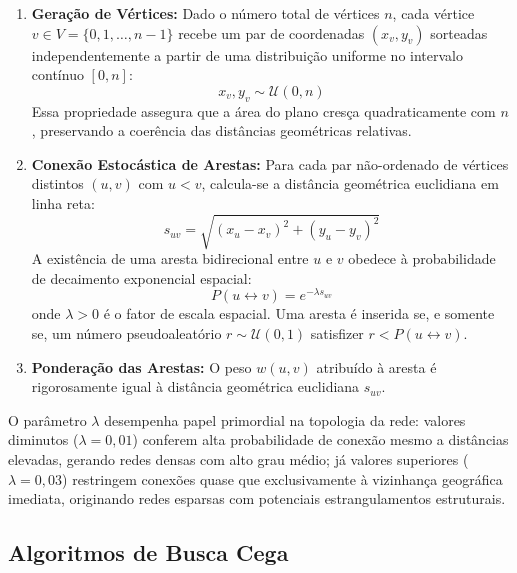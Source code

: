 \documentclass[a4paper,10pt,twocolumn]{article}
\begin{document}
\begin{enumerate}
    \item \textbf{Geração de Vértices:} Dado o número total de vértices $n$, cada vértice $v \in V = \{0, 1, \dots, n-1\}$ recebe um par de coordenadas $(x_v, y_v)$ sorteadas independentemente a partir de uma distribuição uniforme no intervalo contínuo $[0, n]$:
    \begin{equation}
        x_v, y_v \sim \mathcal{U}(0, n)
    \end{equation}
    Essa propriedade assegura que a área do plano cresça quadraticamente com $n$, preservando a coerência das distâncias geométricas relativas.
    
    \item \textbf{Conexão Estocástica de Arestas:} Para cada par não-ordenado de vértices distintos $(u, v)$ com $u < v$, calcula-se a distância geométrica euclidiana em linha reta:
    \begin{equation}
        s_{uv} = \sqrt{(x_u - x_v)^2 + (y_u - y_v)^2}
    \end{equation}
    A existência de uma aresta bidirecional entre $u$ e $v$ obedece à probabilidade de decaimento exponencial espacial:
    \begin{equation}
        P(u \leftrightarrow v) = e^{-\lambda s_{uv}}
    \end{equation}
    onde $\lambda > 0$ é o fator de escala espacial. Uma aresta é inserida se, e somente se, um número pseudoaleatório $r \sim \mathcal{U}(0, 1)$ satisfizer $r < P(u \leftrightarrow v)$.
    
    \item \textbf{Ponderação das Arestas:} O peso $w(u, v)$ atribuído à aresta é rigorosamente igual à distância geométrica euclidiana $s_{uv}$.
\end{enumerate}

O parâmetro $\lambda$ desempenha papel primordial na topologia da rede: valores diminutos ($\lambda = 0{,}01$) conferem alta probabilidade de conexão mesmo a distâncias elevadas, gerando redes densas com alto grau médio; já valores superiores ($\lambda = 0{,}03$) restringem conexões quase que exclusivamente à vizinhança geográfica imediata, originando redes esparsas com potenciais estrangulamentos estruturais.

\subsection{Algoritmos de Busca Cega}
\end{document}
